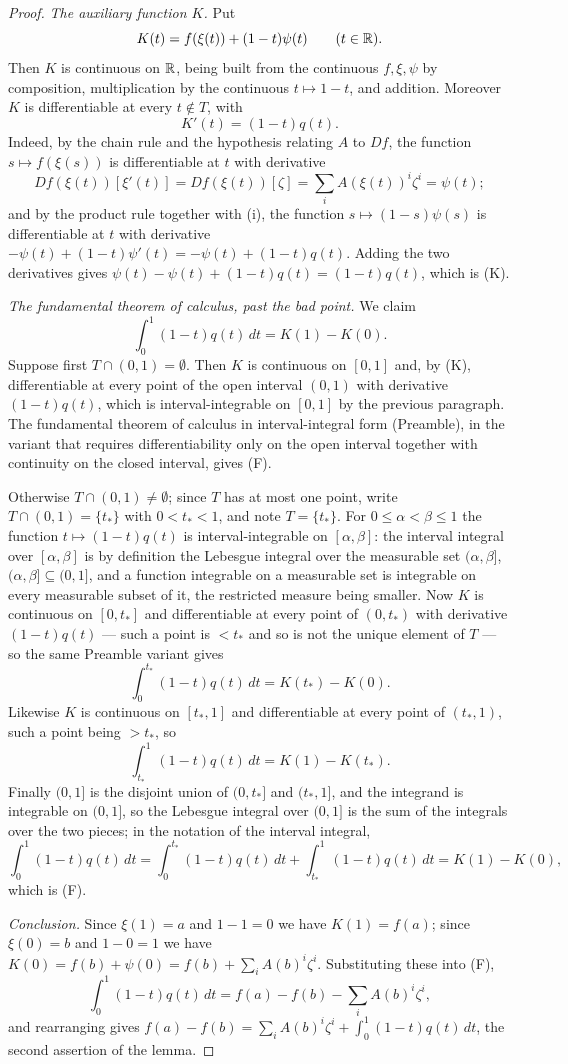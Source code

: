 \begin{proof}
\emph{The auxiliary function $K$.}  Put
\[
K(t)=f(\xi(t))+(1-t)\psi(t)\qquad(t\in\mathbb{R}).
\]
Then $K$ is continuous on $\mathbb{R}$, being built from the continuous $f,\xi,\psi$ by
composition, multiplication by the continuous $t\mapsto1-t$, and addition.
Moreover $K$ is differentiable at every $t\notin T$, with
\[
K'(t)=(1-t)q(t).
\tag{K}
\]
Indeed, by the chain rule and the hypothesis relating $A$ to $Df$, the function
$s\mapsto f(\xi(s))$ is differentiable at $t$ with derivative
\[
Df(\xi(t))[\xi'(t)]=Df(\xi(t))[\zeta]=\sum_iA(\xi(t))^i\zeta^i=\psi(t);
\]
and by the product rule together with (i), the function $s\mapsto(1-s)\psi(s)$
is differentiable at $t$ with derivative
$-\psi(t)+(1-t)\psi'(t)=-\psi(t)+(1-t)q(t)$.  Adding the two derivatives gives
$\psi(t)-\psi(t)+(1-t)q(t)=(1-t)q(t)$, which is (K).

\emph{The fundamental theorem of calculus, past the bad point.}  We claim
\[
\int_0^1(1-t)q(t)\,dt=K(1)-K(0).
\tag{F}
\]
Suppose first $T\cap(0,1)=\emptyset$.  Then $K$ is continuous on $[0,1]$ and,
by (K), differentiable at every point of the open interval $(0,1)$ with
derivative $(1-t)q(t)$, which is interval-integrable on $[0,1]$ by the previous
paragraph.  The fundamental theorem of calculus in interval-integral form
(Preamble), in the variant that requires differentiability only on the open
interval together with continuity on the closed interval, gives (F).

Otherwise $T\cap(0,1)\ne\emptyset$; since $T$ has at most one point, write
$T\cap(0,1)=\{t_\ast\}$ with $0<t_\ast<1$, and note $T=\{t_\ast\}$.  For
$0\le\alpha<\beta\le1$ the function $t\mapsto(1-t)q(t)$ is interval-integrable
on $[\alpha,\beta]$: the interval integral over $[\alpha,\beta]$ is by
definition the Lebesgue integral over the measurable set $(\alpha,\beta]$,
$(\alpha,\beta]\subseteq(0,1]$, and a function integrable on a measurable set is
integrable on every measurable subset of it, the restricted measure being
smaller.  Now $K$ is continuous on $[0,t_\ast]$ and differentiable at every
point of $(0,t_\ast)$ with derivative $(1-t)q(t)$ --- such a point is $<t_\ast$
and so is not the unique element of $T$ --- so the same Preamble variant gives
\[
\int_0^{t_\ast}(1-t)q(t)\,dt=K(t_\ast)-K(0).
\]
Likewise $K$ is continuous on $[t_\ast,1]$ and differentiable at every point of
$(t_\ast,1)$, such a point being $>t_\ast$, so
\[
\int_{t_\ast}^{1}(1-t)q(t)\,dt=K(1)-K(t_\ast).
\]
Finally $(0,1]$ is the disjoint union of $(0,t_\ast]$ and $(t_\ast,1]$, and the
integrand is integrable on $(0,1]$, so the Lebesgue integral over $(0,1]$ is the
sum of the integrals over the two pieces; in the notation of the interval
integral,
\[
\int_0^1(1-t)q(t)\,dt=\int_0^{t_\ast}(1-t)q(t)\,dt+\int_{t_\ast}^1(1-t)q(t)\,dt
=K(1)-K(0),
\]
which is (F).

\emph{Conclusion.}  Since $\xi(1)=a$ and $1-1=0$ we have $K(1)=f(a)$; since
$\xi(0)=b$ and $1-0=1$ we have
$K(0)=f(b)+\psi(0)=f(b)+\sum_iA(b)^i\zeta^i$.  Substituting these into (F),
\[
\int_0^1(1-t)q(t)\,dt=f(a)-f(b)-\sum_iA(b)^i\zeta^i ,
\]
and rearranging gives
$f(a)-f(b)=\sum_iA(b)^i\zeta^i+\int_0^1(1-t)q(t)\,dt$, the second assertion of
the lemma.
\end{proof}
